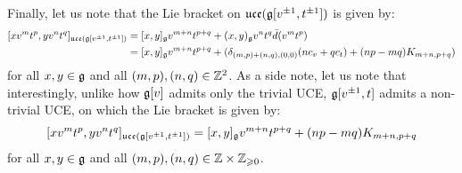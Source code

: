 \begin{example}
            Finally, let us note that the Lie bracket on $\mathfrak{uce}(\mathfrak{g}[v^{\pm 1}, t^{\pm 1}])$ is given by:
                $$
                    \begin{aligned}
                        [x v^m t^p, y v^n t^q]_{\uce(\g[v^{\pm 1}, t^{\pm 1}])} & = [x, y]_{\g} v^{m + n} t^{p + q} + (x, y)_{\g} v^n t^q \bar{d}(v^m t^p)
                        \\
                        & = [x, y]_{\g} v^{m + n} t^{p + q} + ( \delta_{(m, p) + (n, q), (0, 0)} ( n c_v + q c_t ) + (np - mq) K_{m + n, p + q} )
                    \end{aligned}
                $$
            for all $x, y \in \mathfrak{g}$ and all $(m, p), (n, q) \in \mathbb{Z}^2$. As a side note, let us note that interestingly, unlike how $\mathfrak{g}[v]$ admits only the trivial UCE, $\mathfrak{g}[v^{\pm 1}, t]$ admits a non-trivial UCE, on which the Lie bracket is given by:
                $$[x v^m t^p, y v^n t^q]_{\mathfrak{uce}(\mathfrak{g}[v^{\pm 1}, t^{\pm 1}])} = [x, y]_{\mathfrak{g}} v^{m + n} t^{p + q} + (np - mq) K_{m + n, p + q}$$
            for all $x, y \in \mathfrak{g}$ and all $(m, p), (n, q) \in \Z \x \Z_{\geq 0}$.
        \end{example}
